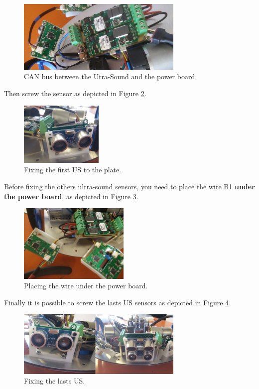 \documentclass[10pt,a4paper]{report}   %
\begin{document}
\begin{figure}[H]
\center
\includegraphics[width=300px]{images/37.jpg}
\caption{CAN bus between the Utra-Sound and the power board.}
\label{fig:37}
\end{figure}

Then screw the sensor as depicted in Figure \ref{fig:38}.

\begin{figure}[H]
\center
\includegraphics[width=150px]{images/38.jpg}
\caption{Fixing the first US to the plate.}
\label{fig:38}
\end{figure}

Before fixing the others ultra-sound sensors, you need to place the wire B1 \textbf{under the power board}, as depicted in Figure \ref{fig:39}.

\begin{figure}[H]
\center
\includegraphics[width=200px]{images/39.jpg}
\caption{Placing the wire under the power board.}
\label{fig:39}
\end{figure}

Finally it is possible to screw the lasts US sensors as depicted in Figure \ref{fig:40}.

\begin{figure}[H]
\center
\includegraphics[width=300px]{images/40.jpg}
\caption{Fixing the lasts US.}
\label{fig:40}
\end{figure}
\end{document}
